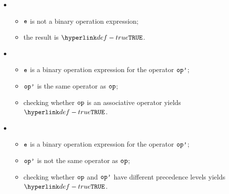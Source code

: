\ProseParagraph
\OneApplies
\begin{itemize}
  \item {}
  \begin{itemize}
    \item $\ve$ is not a binary operation expression;
    \item the result is $\True$.
  \end{itemize}

  \item {}
  \begin{itemize}
    \item $\ve$ is a binary operation expression for the operator $\opp$;
    \item $\opp$ is the same operator as $\op$;
    \item checking whether $\op$ is an associative operator yields $\True$\ProseTerminateAs{\BinopPrecedence}.
  \end{itemize}

  \item {}
  \begin{itemize}
    \item $\ve$ is a binary operation expression for the operator $\opp$;
    \item $\opp$ is not the same operator as $\op$;
    \item checking whether $\op$ and $\opp$ have different precedence levels yields $\True$\ProseTerminateAs{\BinopPrecedence}.
  \end{itemize}
\end{itemize}

\FormallyParagraph
\begin{mathpar}
\end{mathpar}

\begin{mathpar}
\end{mathpar}

